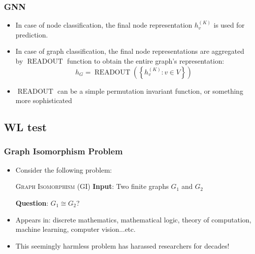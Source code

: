 \documentclass[handout]{beamer}
\DeclareMathOperator{\readout}{READOUT}
\begin{document}
\begin{frame}
\frametitle{GNN}

\begin{itemize}
	\item In case of node classification, the final node representation $h_v^{(K)}$ is used for prediction. \pause
	
	\item In case of graph classification, the final node representations are aggregated by $\readout$ function to obtain the entire graph's representation:
	$$h_G = \readout \left( \left\{ h_v^{(K)} : v \in V \right\} \right)$$ \pause
	
	\item $\readout$ can be a simple permutation invariant function, or something more sophisticated
\end{itemize}

\end{frame}


\subsection{WL test}

\begin{frame}
\frametitle{Graph Isomorphism Problem}

\begin{itemize}
	\item Consider the following problem: \pause
	
\begin{block}{\textsc{Graph Isomorphism (GI)}}
{\bf Input}:  Two finite graphs $G_1$ and $G_2$

{\bf Question}: $G_1 \cong G_2$?

\end{block} \pause

	\item Appears in: discrete mathematics, mathematical logic, theory of computation, machine learning, computer vision...etc. \pause
	
	\item This seemingly harmless problem has harassed researchers for decades!
\end{itemize}

\end{frame}
\end{document}
